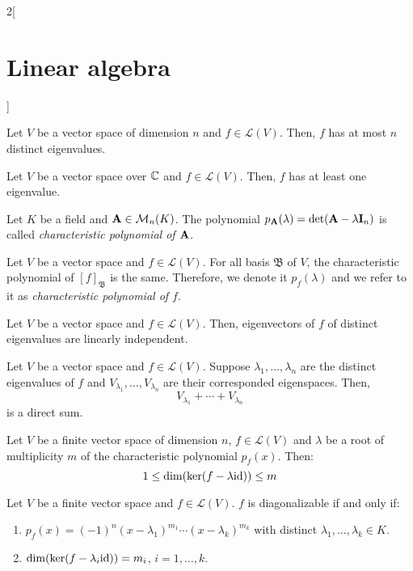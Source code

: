 \documentclass[../../../main.tex]{subfiles}
\begin{document}
\begin{multicols}{2}[\section{Linear algebra}]
  \begin{corollary}
    Let $V$ be a vector space of dimension $n$ and $f\in\mathcal{L}(V)$. Then, $f$ has at most $n$ distinct eigenvalues.
  \end{corollary}
  \begin{corollary}
    Let $V$ be a vector space over $\mathbb{C}$ and $f\in\mathcal{L}(V)$. Then, $f$ has at least one eigenvalue.
  \end{corollary}
  \begin{definition}
    Let $K$ be a field and $\boldsymbol{\mathrm{A}}\in\mathcal{M}_n(K)$. The polynomial $p_{\boldsymbol{\mathrm{A}}}(\lambda)=\det(\boldsymbol{\mathrm{A}}-\lambda \boldsymbol{\mathrm{I}}_n)$ is called \textit{characteristic polynomial of $\boldsymbol{\mathrm{A}}$}.
  \end{definition}
  \begin{prop}
    Let $V$ be a vector space and $f\in\mathcal{L}(V)$. For all basis $\mathfrak{B}$ of $V$, the characteristic polynomial of $[f]_\mathfrak{B}$ is the same. Therefore, we denote it $p_f(\lambda)$ and we refer to it as \textit{characteristic polynomial of $f$}.
  \end{prop}
  \begin{prop}
    Let $V$ be a vector space and $f\in\mathcal{L}(V)$. Then, eigenvectors of $f$ of distinct eigenvalues are linearly independent.
  \end{prop}
  \begin{corollary}
    Let $V$ be a vector space and $f\in\mathcal{L}(V)$. Suppose $\lambda_1,\ldots,\lambda_n$ are the distinct eigenvalues of $f$ and $V_{\lambda_1},\ldots,V_{\lambda_n}$ are their corresponded eigenspaces. Then, $$V_{\lambda_1}+\cdots+V_{\lambda_n}$$ is a direct sum.
  \end{corollary}
  \begin{prop}
    Let $V$ be a finite vector space of dimension $n$, $f\in\mathcal{L}(V)$ and $\lambda$ be a root of multiplicity $m$ of the characteristic polynomial $p_f(x)$. Then: $$1\leq \dim(\ker(f-\lambda\mathrm{id}))\leq m$$
  \end{prop}
  \begin{theorem}
    Let $V$ be a finite vector space and $f\in\mathcal{L}(V)$. $f$ is diagonalizable if and only if:
    \begin{enumerate}
      \item $p_f(x)=(-1)^n(x-\lambda_1)^{m_1}\cdots(x-\lambda_k)^{m_k}$ with distinct $\lambda_1,\ldots,\lambda_k\in K$.
      \item $\dim(\ker(f-\lambda_i \mathrm{id}))=m_i$, $i=1,\ldots,k$.

\end{enumerate}
\end{theorem}
\end{multicols}
\end{document}
